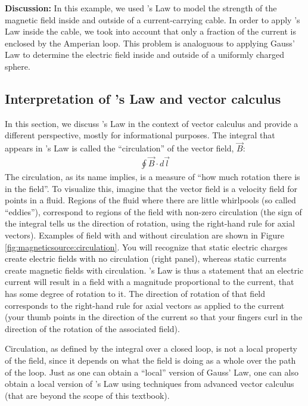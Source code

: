 \begin{example}
\textbf{Discussion:} In this example, we used \ampere's Law to model the strength of the magnetic field inside and outside of a current-carrying cable. In order to apply \ampere's Law inside the cable, we took into account that only a fraction of the current is enclosed by the Amperian loop. This problem is analoguous to applying Gauss' Law to determine the electric field inside and outside of a uniformly charged sphere. 
\end{example}

\subsection{Interpretation of \ampere's Law and vector calculus} 
\label{sec:magneticsource:interpretation}
In this section, we discuss \ampere's Law in the context of vector calculus and provide a different perspective, mostly for informational purposes. The integral that appears in \ampere's Law is called the ``circulation'' of the vector field, $\vec B$:
\begin{align*}
\oint \vec B \cdot d\vec l
\end{align*}
The circulation, as its name implies, is a measure of ``how much rotation there is in the field''. To visualize this, imagine that the vector field is a velocity field for points in a fluid. Regions of the fluid where there are little whirlpools (so called ``eddies''), correspond to regions of the field with non-zero circulation (the sign of the integral tells us the direction of rotation, using the right-hand rule for axial vectors). Examples of field with and without circulation are shown in Figure \ref{fig:magneticsource:circulation}. You will recognize that static electric charges create electric fields with no circulation (right panel), whereas static currents create magnetic fields with circulation.
\ampere's Law is thus a statement that an electric current will result in a field with a magnitude proportional to the current, that has some degree of rotation to it. The direction of rotation of that field corresponds to the right-hand rule for axial vectors as applied to the current (your thumb points in the direction of the current so that your fingers curl in the direction of the rotation of the associated field). 

Circulation, as defined by the integral over a closed loop, is not a local property of the field, since it depends on what the field is doing as a whole over the path of the loop. Just as one can obtain a ``local'' version of  Gauss' Law, one can also obtain a local version of \ampere's Law using techniques from advanced vector calculus (that are beyond the scope of this textbook).

